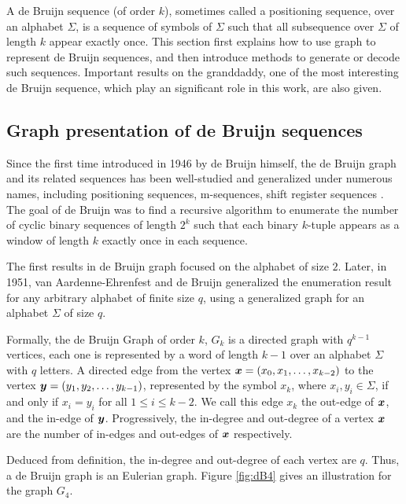A de Bruijn sequence (of order $k$), sometimes called a positioning sequence, over an alphabet $\Sigma$, is a sequence of symbols of $\Sigma$ such that all subsequence over $\Sigma$ of length $k$ appear exactly once. This section first explains how to use graph to represent de Bruijn sequences, and then introduce methods to generate or decode such sequences. Important results on the granddaddy, one of the most interesting de Bruijn sequence, which play an significant role in this work, are also given. 

\subsection{Graph presentation of de Bruijn sequences}

Since the first time introduced in 1946 by de Bruijn himself, the de Bruijn graph and its related sequences has been well-studied and generalized under numerous names, including positioning sequences, m-sequences, shift register sequences \cite{song2021robust,etzion1984algorithms,fredricksen1982survey,lempel1970homomorphism,cohn1977fast}. The goal of de Bruijn was to find a recursive algorithm to enumerate the number of cyclic binary sequences of length $2^k$ such that each binary $k$-tuple appears as a window of length $k$ exactly once in each sequence. 

The first results in de Bruijn graph focused on the alphabet of size $2$. Later, in 1951, van Aardenne-Ehrenfest and de Bruijn \cite{van1951circuits} generalized the enumeration result for any arbitrary alphabet of finite size $q$, using a generalized graph for an alphabet $\Sigma$ of size $q$. 

\begin{definition}
    Formally, the de Bruijn Graph of order $k$, $G_{k}$ is a directed graph with $q^{k-1}$ vertices, each one is represented by a word of length $k-1$ over an alphabet $\Sigma$ with $q$ letters. A directed edge from the vertex ${\boldsymbol x}=(x_{0},x_{1},\ldots,x_{k-2})$ to the vertex ${\boldsymbol y}=(y_{1},y_{2},\ldots,y_{k-1})$, represented by the symbol $x_{k}$, where $x_{i},y_{i}\in\Sigma$, if and only if $x_{i}=y_{i}$ for all $1\leq i\leq k-2$. We call this edge $x_{k}$ the out-edge of ${\boldsymbol x}$, and the in-edge of ${\boldsymbol y}$. Progressively, the in-degree and out-degree of a vertex ${\boldsymbol x}$ are the number of in-edges and out-edges of ${\boldsymbol x}$ respectively.
\end{definition}  Deduced from definition, the in-degree and out-degree of each vertex are $q$. Thus, a de Bruijn graph is an Eulerian graph. Figure \ref{fig:dB4} gives an illustration for the graph $G_{4}$.

